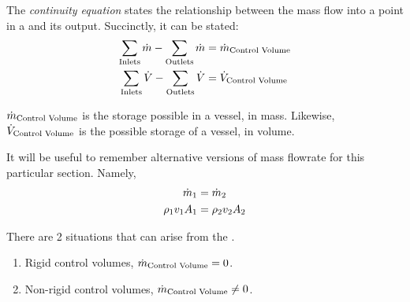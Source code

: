 \begin{definition}\label{def:Continuity_Equation}
  The \emph{continuity equation} states the relationship between the mass flow into a point in a  and its output.
  Succinctly, it can be stated:
  \begin{equation}\label{eq:Continuity_Equation}
    \begin{aligned}
      \sum\limits_{\text{Inlets}} \dot{m} - \sum\limits_{\text{Outlets}} \dot{m} &= \dot{m}_{\text{Control Volume}} \\
      \sum\limits_{\text{Inlets}} \dot{V} - \sum\limits_{\text{Outlets}} \dot{V} &= \dot{V}_{\text{Control Volume}}
    \end{aligned}
  \end{equation}

  \begin{description}[noitemsep]
  \item $\dot{m}_{\text{Control Volume}}$ is the storage possible in a vessel, in mass.
    Likewise, $\dot{V}_{\text{Control Volume}}$ is the possible storage of a vessel, in volume.
  \end{description}

  \begin{remark}\label{rmk:Alternative_Mass_Flowrate_Defns}
    It will be useful to remember alternative versions of mass flowrate for this particular section.
    Namely,
    \begin{align*}
      \dot{m}_{1} &= \dot{m}_{2} \\
      \rho_{1} v_{1} A_{1} &= \rho_{2} v_{2} A_{2}
    \end{align*}
  \end{remark}
\end{definition}

There are 2 situations that can arise from the .
\begin{enumerate}[noitemsep]
\item Rigid control volumes, $\dot{m}_{\text{Control Volume}} = 0$.
\item Non-rigid control volumes, $\dot{m}_{\text{Control Volume}} \neq 0$.
\end{enumerate}

